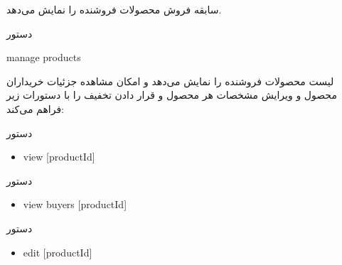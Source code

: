 \documentclass[]{article}
\begin{document}
سابقه فروش محصولات فروشنده را نمایش می‌دهد.


\hrulefill

\newpage

\begin{mybox}[colback=yellow]{دستور}

\begin{latin}

manage products

\end{latin}

\end{mybox}

لیست محصولات فروشنده را نمایش می‌دهد و امکان مشاهده جزئیات خریداران محصول و ویرایش مشخصات هر محصول و قرار دادن تخفیف را با دستورات زیر فراهم می‌کند:


\begin{mybox}[colback=brilliantlavender]{دستور}

\begin{latin}

\begin{itemize}[label = {$\Rightarrow$}]

\item
view [productId]

\end{itemize}

\end{latin}

\end{mybox}

\begin{mybox}[colback=brilliantlavender]{دستور}

\begin{latin}

\begin{itemize}[label = {$\Rightarrow$}]

\item
view buyers [productId]

\end{itemize}

\end{latin}

\end{mybox}

\begin{mybox}[colback=brilliantlavender]{دستور}

\begin{latin}

\begin{itemize}[label = {$\Rightarrow$}]

\item
edit [productId]

\end{itemize}

\end{latin}

\end{mybox}
\end{document}

